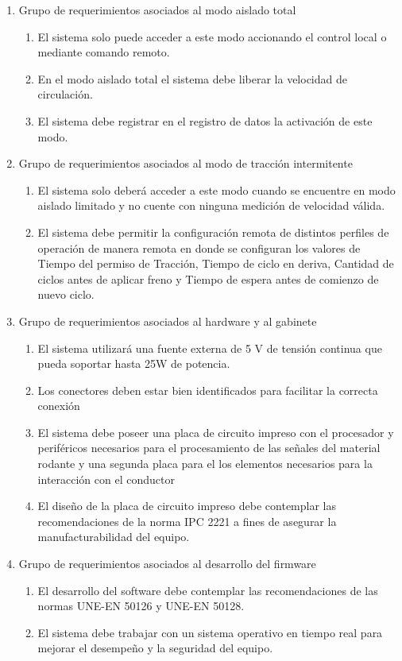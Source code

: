 \begin{enumerate}
    \item Grupo de requerimientos asociados al modo aislado total
    \begin{enumerate}
        \item El sistema solo puede acceder a este modo accionando el control local o mediante comando remoto.
        \item En el modo aislado total el sistema debe liberar la velocidad de circulación.
        \item El sistema debe registrar en el registro de datos la activación de este modo.
    \end{enumerate}
       
    \item Grupo de requerimientos asociados al modo de tracción intermitente
    \begin{enumerate}
        \item El sistema solo deberá acceder a este modo cuando se encuentre en modo aislado limitado y no cuente con ninguna medición de velocidad válida.
        \item El sistema debe permitir la configuración remota de distintos perfiles de operación de manera remota en donde se configuran los valores de Tiempo del permiso de Tracción, Tiempo de ciclo en deriva, Cantidad de ciclos antes de aplicar freno y Tiempo de espera antes de comienzo de nuevo ciclo.
    \end{enumerate}
       
    \item Grupo de requerimientos asociados al hardware y al gabinete
    \begin{enumerate}
        \item El sistema utilizará una fuente externa de 5 V de tensión continua que pueda soportar hasta 25W de potencia.
        \item Los conectores deben estar bien identificados para facilitar la correcta conexión
        \item El sistema debe poseer una placa de circuito impreso con el procesador y periféricos necesarios para el procesamiento de las señales del material rodante y una segunda placa para el los elementos necesarios para la interacción con el conductor
        \item El diseño de la placa de circuito impreso debe contemplar las recomendaciones de la norma IPC 2221 a fines de asegurar la manufacturabilidad del equipo. 
    \end{enumerate}
           
    \item Grupo de requerimientos asociados al desarrollo del firmware
    \begin{enumerate}
        \item El desarrollo del software debe contemplar las recomendaciones de las normas UNE-EN 50126 y UNE-EN 50128.
        \item El sistema debe trabajar con un sistema operativo en tiempo real para mejorar el desempeño y la seguridad del equipo.
    \end{enumerate}
\end{enumerate}
